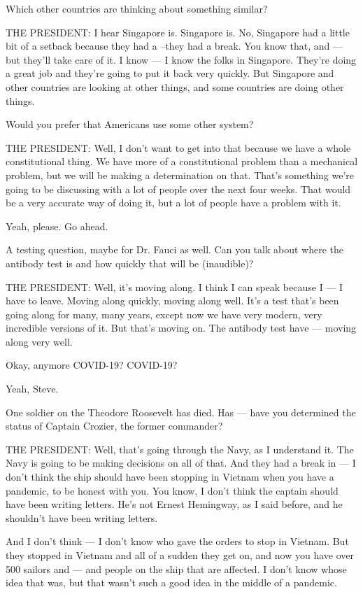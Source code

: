 Which other countries are thinking about something similar?

THE PRESIDENT: I hear Singapore is. Singapore is. No, Singapore had a
little bit of a setback because they had a --they had a break. You know
that, and --- but they'll take care of it. I know --- I know the folks
in Singapore. They're doing a great job and they're going to put it back
very quickly. But Singapore and other countries are looking at other
things, and some countries are doing other things.

Would you prefer that Americans use some other system?

THE PRESIDENT: Well, I don't want to get into that because we have a
whole constitutional thing. We have more of a constitutional problem
than a mechanical problem, but we will be making a determination on
that. That's something we're going to be discussing with a lot of people
over the next four weeks. That would be a very accurate way of doing it,
but a lot of people have a problem with it.

Yeah, please. Go ahead.

A testing question, maybe for Dr. Fauci as well. Can you talk about
where the antibody test is and how quickly that will be (inaudible)?

THE PRESIDENT: Well, it's moving along. I think I can speak because I
--- I have to leave. Moving along quickly, moving along well. It's a
test that's been going along for many, many years, except now we have
very modern, very incredible versions of it. But that's moving on. The
antibody test have --- moving along very well.

Okay, anymore COVID-19? COVID-19?

Yeah, Steve.

One soldier on the Theodore Roosevelt has died. Has --- have you
determined the status of Captain Crozier, the former commander?

THE PRESIDENT: Well, that's going through the Navy, as I understand it.
The Navy is going to be making decisions on all of that. And they had a
break in --- I don't think the ship should have been stopping in Vietnam
when you have a pandemic, to be honest with you. You know, I don't think
the captain should have been writing letters. He's not Ernest Hemingway,
as I said before, and he shouldn't have been writing letters.

And I don't think --- I don't know who gave the orders to stop in
Vietnam. But they stopped in Vietnam and all of a sudden they get on,
and now you have over 500 sailors and --- and people on the ship that
are affected. I don't know whose idea that was, but that wasn't such a
good idea in the middle of a pandemic.

